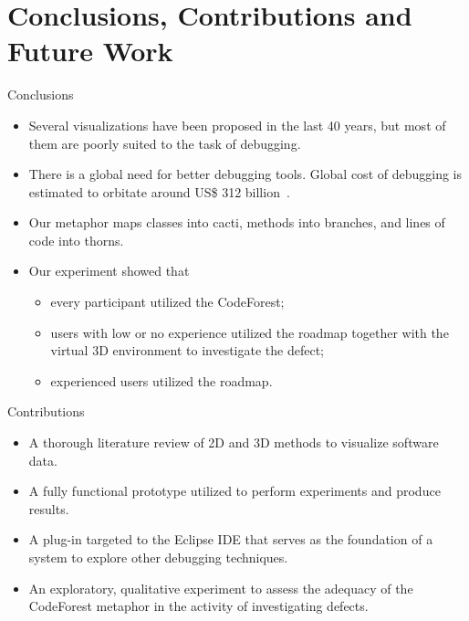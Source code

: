 \documentclass[handout]{beamer}
\begin{document}
\section{Conclusions, Contributions and Future Work}

\begin{frame}
    \sectionpage
\end{frame}

\begin{frame}{Conclusions}
    \begin{itemize}
        \item Several visualizations have been proposed in the last 40 years,
        but most of them are poorly suited to the task of debugging.
        \item There is a global need for better debugging tools. Global cost of
        debugging is estimated to orbitate around US\$ 312
        billion~\cite{britton2013reversible}.
        \item Our metaphor maps classes into cacti, methods into branches, and
        lines of code into thorns.
        \item Our experiment showed that
            \begin{itemize}
                \item every participant utilized the CodeForest;
                \item users with low or no experience utilized the roadmap
                together with the virtual 3D environment to investigate the
                defect;
                \item experienced users utilized the roadmap.
            \end{itemize}
    \end{itemize}
\end{frame}

\begin{frame}{Contributions}
    \begin{itemize}
        \item A thorough literature review of 2D and 3D methods to visualize
        software data.
        \item A fully functional prototype utilized to perform experiments and produce results.
        \item A plug-in targeted to the Eclipse IDE that serves as the
        foundation of a system to explore other debugging techniques.
        \item An exploratory, qualitative experiment to assess the adequacy of
        the CodeForest metaphor in the activity of investigating defects.
    \end{itemize}
\end{frame}
\end{document}

